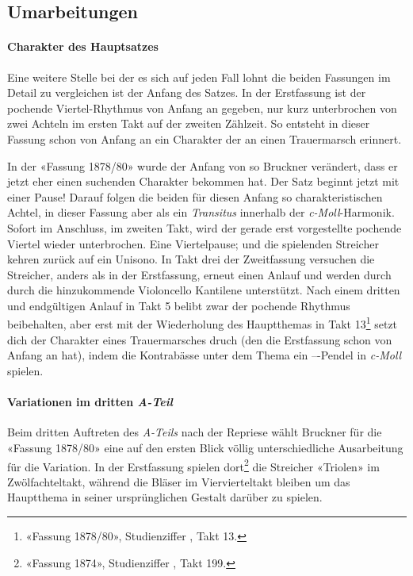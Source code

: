 \subsection{Umarbeitungen}

\paragraph{Charakter des Hauptsatzes}

Eine weitere Stelle bei der es sich auf jeden Fall lohnt die beiden Fassungen im Detail zu vergleichen ist der Anfang des Satzes.
In der Erstfassung ist der pochende Viertel-Rhythmus von Anfang an gegeben, nur kurz unterbrochen von zwei Achteln im ersten Takt auf der zweiten Zählzeit. So entsteht in dieser Fassung schon von Anfang an ein Charakter der an einen Trauermarsch erinnert.

In der «Fassung 1878/80» wurde der Anfang von so Bruckner verändert, dass er jetzt eher einen suchenden Charakter bekommen hat.
Der Satz beginnt jetzt mit einer Pause! Darauf folgen die beiden für diesen Anfang so charakteristischen Achtel, in dieser Fassung aber als ein \emph{Transitus} innerhalb der \emph{c-Moll}-Harmonik.
Sofort im Anschluss, im zweiten Takt, wird der gerade erst vorgestellte pochende Viertel wieder unterbrochen.
Eine Viertelpause; und die spielenden Streicher kehren zurück auf ein Unisono.
In Takt drei der Zweitfassung versuchen die Streicher, anders als in der Erstfassung, erneut einen Anlauf und werden durch durch die hinzukommende Violoncello Kantilene unterstützt.
Nach einem dritten und endgültigen Anlauf in Takt 5 belibt zwar der pochende Rhythmus beibehalten, aber erst mit der Wiederholung des Hauptthemas in Takt 13\footnote{«Fassung 1878/80», Studienziffer , Takt 13.} setzt dich der Charakter eines Trauermarsches druch (den die Erstfassung schon von Anfang an hat), indem die Kontrabässe unter dem Thema ein ---Pendel in \emph{c-Moll} spielen.

\paragraph{Variationen im dritten \emph{A-Teil}}

Beim dritten Auftreten des \emph{A-Teils} nach der Repriese wählt Bruckner für die «Fassung 1878/80» eine auf den ersten Blick völlig unterschiedliche Ausarbeitung für die Variation.
In der Erstfassung spielen dort\footnote{«Fassung 1874», Studienziffer , Takt 199.} die Streicher «Triolen» im Zwölfachteltakt, während die Bläser im Viervierteltakt bleiben um das Hauptthema in seiner ursprünglichen Gestalt darüber zu spielen.

